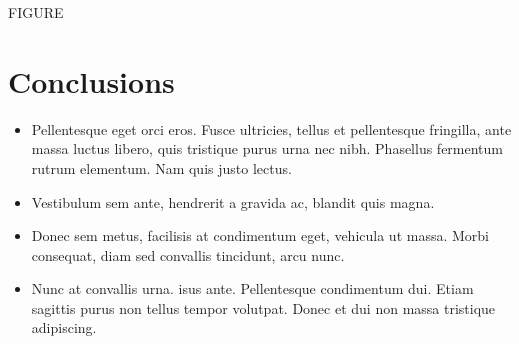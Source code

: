 \documentclass[a0,portrait]{a0poster}
\begin{document}
\begin{multicols}{2}
FIGURE



\color{SaddleBrown} %

\section*{Conclusions}

\begin{itemize}
\item Pellentesque eget orci eros. Fusce ultricies, tellus et pellentesque fringilla, ante massa luctus libero, quis tristique purus urna nec nibh. Phasellus fermentum rutrum elementum. Nam quis justo lectus.
\item Vestibulum sem ante, hendrerit a gravida ac, blandit quis magna.
\item Donec sem metus, facilisis at condimentum eget, vehicula ut massa. Morbi consequat, diam sed convallis tincidunt, arcu nunc.
\item Nunc at convallis urna. isus ante. Pellentesque condimentum dui. Etiam sagittis purus non tellus tempor volutpat. Donec et dui non massa tristique adipiscing.
\end{itemize}

\color{DarkSlateGray} %


\nocite{*} %

\end{multicols}
\end{document}
